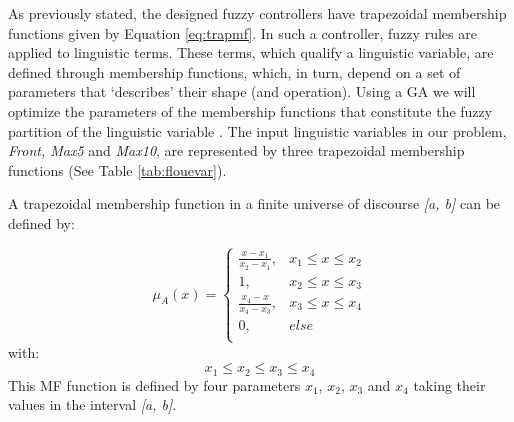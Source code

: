 \documentclass[conference]{IEEEtran}
\begin{document}

As previously stated, the designed fuzzy controllers have trapezoidal membership functions given by Equation \ref{eq:trapmf}.
In such a controller, fuzzy rules are applied to linguistic
terms. These terms, which qualify a linguistic variable, are defined
through membership functions, which, in turn, depend on a set of
parameters that `describes' their shape (and operation). Using a GA we
will optimize the parameters of the membership functions that
constitute the fuzzy partition of the linguistic variable
\cite{ThangG08}. The input linguistic variables in our problem,
\textit{Front, Max5} and \textit{Max10}, are represented by three
trapezoidal membership functions (See Table \ref{tab:flouevar}). %


A trapezoidal membership function in a finite universe of discourse \textit{[a, b]} can be defined by:

\begin{equation}
\mu_{A}(x)= \left \{
\begin{array}{ll}
\frac{x - x_{1}}{x_{2} - x_{1}},& x_{1} \leq x \leq x_{2}\\
1 , &x_{2} \leq x \leq x_{3}\\
\frac{x_{4} - x}{x_{4} - x_{3}},& x_{3} \leq x \leq x_{4}\\
0        ,& else\\	
\end{array}
\right.
\label{eq:trapmf}
\end{equation}
with:
\begin{equation}
x_{1} \leq x_{2} \leq x_{3} \leq x_{4}
\end{equation}
This MF function is defined by four parameters $x_{1}$, $x_{2}$,
$x_{3}$ and $x_{4}$ taking their values in the interval \textit{[a,
  b]}.%
\end{document}

